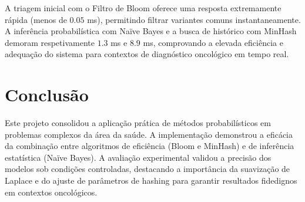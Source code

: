 \documentclass[11pt,a4paper]{article}
\begin{document}
A triagem inicial com o Filtro de Bloom oferece uma resposta extremamente rápida (menos de $0.05$ ms), permitindo filtrar variantes comuns instantaneamente. A inferência probabilística com Naïve Bayes e a busca de histórico com MinHash demoram respetivamente $1.3$ ms e $8.9$ ms, comprovando a elevada eficiência e adequação do sistema para contextos de diagnóstico oncológico em tempo real.

\section*{Conclusão}
Este projeto consolidou a aplicação prática de métodos probabilísticos em problemas complexos da área da saúde. A implementação demonstrou a eficácia da combinação entre algoritmos de eficiência (Bloom e MinHash) e de inferência estatística (Naïve Bayes). A avaliação experimental validou a precisão dos modelos sob condições controladas, destacando a importância da suavização de Laplace e do ajuste de parâmetros de hashing para garantir resultados fidedignos em contextos oncológicos.
\end{document}
